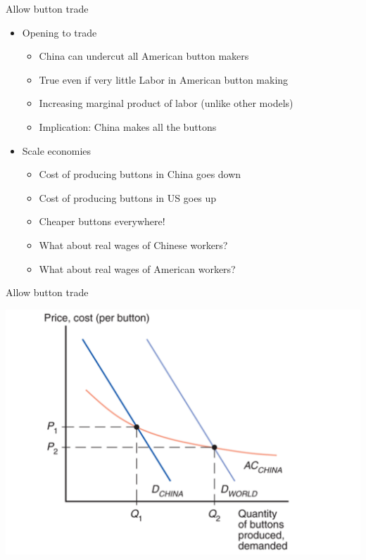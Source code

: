 \documentclass[ignorenonframetext,]{beamer}
\begin{document}
\begin{frame}{Allow button trade}

    \begin{itemize}
        \item Opening to trade
        \begin{itemize}
            \item China can undercut all American button makers 
            \item True even if very little Labor in American button making
            \item Increasing marginal product of labor (unlike other models)
            \item Implication: China makes all the buttons
        \end{itemize} 
        \item Scale economies
        \begin{itemize}
            \item Cost of producing buttons in China goes down
            \item Cost of producing buttons in US goes up 
            \item Cheaper buttons everywhere!
            \item What about real wages of Chinese workers?
            \item What about real wages of American workers?
        \end{itemize}
    \end{itemize}

\end{frame}

\begin{frame}{Allow button trade}

    \includegraphics[scale=0.20]{button_trade.png}

\end{frame}
\end{document}
